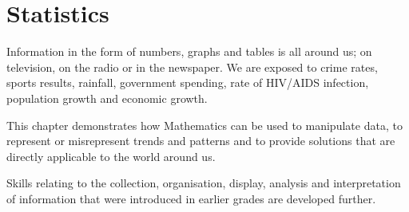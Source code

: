         \chapter{Statistics}
    \setcounter{figure}{1}
    \setcounter{subfigure}{1}
    \label{ea5128681e667fecbf404a0996287edc}
%     
%     
%             
%       
      \label{m39403*id199946}Information in the form of numbers, graphs and tables is all around us; on television, on the radio or in the newspaper. We are exposed to crime rates, sports results, rainfall, government spending, rate of HIV/AIDS infection, population growth and economic growth.\par 
      \label{m39403*eip-765}This chapter demonstrates how Mathematics can be used to manipulate data, to represent or misrepresent trends and patterns and to provide solutions that are directly applicable to the world around us.
\par \label{m39403*id199957}Skills relating to the collection, organisation, display, analysis and interpretation of information that were introduced in earlier grades are developed further.\par 
%             
%       
        \label{m39403*uid1}
